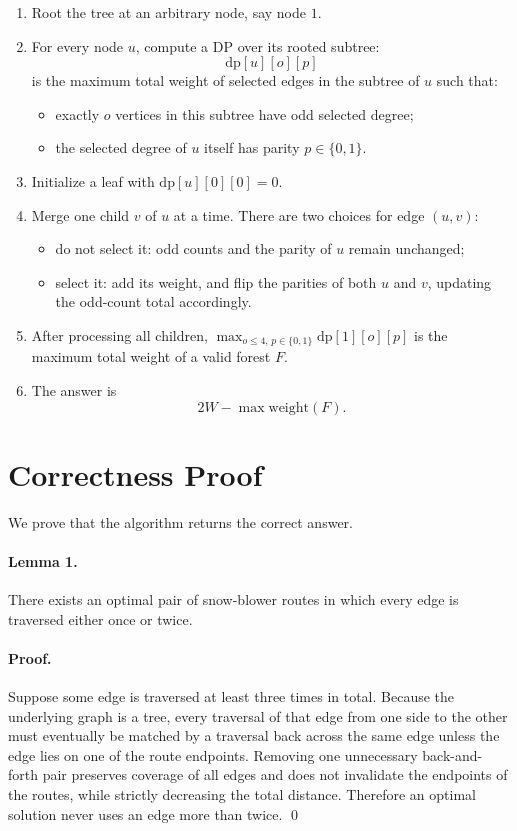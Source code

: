 \documentclass[11pt]{article}
\begin{document}
\begin{enumerate}[leftmargin=*]
    \item Root the tree at an arbitrary node, say node $1$.
    \item For every node $u$, compute a DP over its rooted subtree:
    \[
        \text{dp}[u][o][p]
    \]
    is the maximum total weight of selected edges in the subtree of $u$ such that:
    \begin{itemize}[leftmargin=*]
        \item exactly $o$ vertices in this subtree have odd selected degree;
        \item the selected degree of $u$ itself has parity $p \in \{0,1\}$.
    \end{itemize}
    \item Initialize a leaf with $\text{dp}[u][0][0]=0$.
    \item Merge one child $v$ of $u$ at a time.
    There are two choices for edge $(u,v)$:
    \begin{itemize}[leftmargin=*]
        \item do not select it: odd counts and the parity of $u$ remain unchanged;
        \item select it: add its weight, and flip the parities of both $u$ and $v$, updating the odd-count
        total accordingly.
    \end{itemize}
    \item After processing all children, $\max_{o \le 4,\, p \in \{0,1\}} \text{dp}[1][o][p]$ is the maximum total
    weight of a valid forest $F$.
    \item The answer is
    \[
        2W - \max \text{weight}(F).
    \]
\end{enumerate}

\section*{Correctness Proof}

We prove that the algorithm returns the correct answer.

\paragraph{Lemma 1.}
There exists an optimal pair of snow-blower routes in which every edge is traversed either once or twice.

\paragraph{Proof.}
Suppose some edge is traversed at least three times in total. Because the underlying graph is a tree, every
traversal of that edge from one side to the other must eventually be matched by a traversal back across the
same edge unless the edge lies on one of the route endpoints. Removing one unnecessary back-and-forth
pair preserves coverage of all edges and does not invalidate the endpoints of the routes, while strictly
decreasing the total distance. Therefore an optimal solution never uses an edge more than twice. \qed
\end{document}
